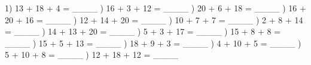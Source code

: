 \documentclass{article}%
\begin{document}
1) 13 + 18 + 4 = \_\_\_\_%
\newline%
\newline%
) 16 + 3 + 12 = \_\_\_\_%
\newline%
\newline%
) 20 + 6 + 18 = \_\_\_\_%
\newline%
\newline%
) 16 + 20 + 16 = \_\_\_\_%
\newline%
\newline%
) 12 + 14 + 20 = \_\_\_\_%
\newline%
\newline%
) 10 + 7 + 7 = \_\_\_\_%
\newline%
\newline%
) 2 + 8 + 14 = \_\_\_\_%
\newline%
\newline%
) 14 + 13 + 20 = \_\_\_\_%
\newline%
\newline%
) 5 + 3 + 17 = \_\_\_\_%
\newline%
\newline%
) 15 + 8 + 8 = \_\_\_\_%
\newline%
\newline%
) 15 + 5 + 13 = \_\_\_\_%
\newline%
\newline%
) 18 + 9 + 3 = \_\_\_\_%
\newline%
\newline%
) 4 + 10 + 5 = \_\_\_\_%
\newline%
\newline%
) 5 + 10 + 8 = \_\_\_\_%
\newline%
\newline%
) 12 + 18 + 12 = \_\_\_\_%
\newline%
\newline%
\end{document}
